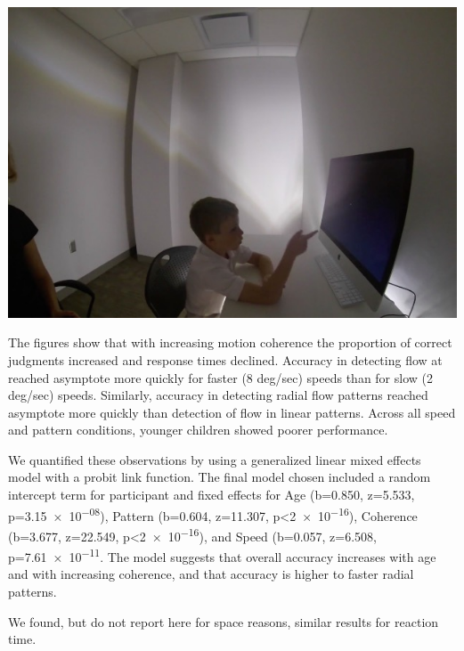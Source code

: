 \documentclass[landscape,final,paperwidth=60in,paperheight=40in,fontscale=0.285]{baposter}
\begin{document}
\begin{poster}
{\begin{center}
\vspace{1em}
\includegraphics[scale=0.33]{img/apparatus-setup.jpg}\\
\vspace{1em}
\end{center}
    }
    {
\par The figures show that with increasing motion coherence the proportion of correct judgments increased and response times declined. Accuracy in detecting flow at reached asymptote more quickly for faster (8 deg/sec) speeds than for slow (2 deg/sec) speeds. Similarly, accuracy in detecting radial flow patterns reached asymptote more quickly than detection of flow in linear patterns. Across all speed and pattern conditions, younger children showed poorer performance.
\par We quantified these observations by using a generalized linear mixed effects model with a probit link function. The final model chosen included a random intercept term for participant and fixed effects for Age (b=0.850, z=5.533, p=\num{3.15e-08}), Pattern (b=0.604, z=11.307, p<\num{2e-16}), Coherence (b=3.677, z=22.549, p<\num{2e-16}), and Speed (b=0.057, z=6.508, p=\num{7.61e-11}. The model suggests that overall accuracy increases with age and with increasing coherence, and that accuracy is higher to faster radial patterns. 
\par We found, but do not report here for space reasons, similar results for reaction time.
}


\end{poster}
\end{document}
